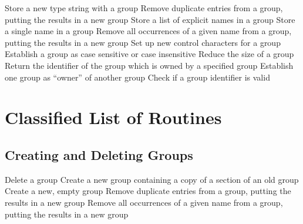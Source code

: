             {Store a new type string with a group}
            {Remove duplicate entries from a group, putting the results in a new
group}
            {Store a list of explicit names in a group}
            {Store a single name in a group}
            {Remove all occurrences of a given name from a group, putting the results in a new group}
            {Set up new control characters for a group}
            {Establish a group as case sensitive or case insensitive}
            {Reduce the size of a group}
            {Return the identifier of the group which is owned by a
specified group}
            {Establish one group as ``owner'' of another group}
            {Check if a group identifier is valid}

\section{Classified List of Routines}

\subsection{Creating and Deleting Groups}

            {Delete a group}
            {Create a new group containing a copy of a section of an old group}
            {Create a new, empty group}
            {Remove duplicate entries from a group, putting the results in a new
group}
            {Remove all occurrences of a given name from a group, putting the results in a new group}

